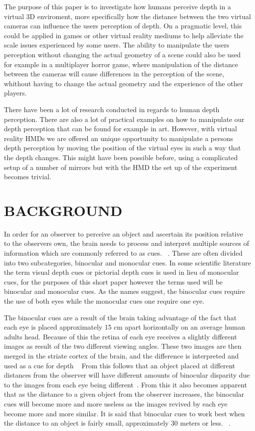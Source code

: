 \documentclass[tog]{acmsiggraph}
\begin{document}
The purpose of this paper is to investigate how humans perceive depth in a virtual 3D enviroment, more specifically how the distance between the two virtual cameras can influence the users perception of depth. On a pragmatic level, this could be applied in games or other virtual reality mediums to help alleviate the scale issues experienced by some users. The ability to manipulate the users perception without changing the actual geometry of a scene could also be used for example in a multiplayer horror game, where manipulation of the distance between the cameras will cause differences in the perception of the scene, whithout having to change the actual geometry and the experience of the other players.    

There have been a lot of research conducted in regards to human depth perception. There are also a lot of practical examples on how to manipulate our depth perception that can be found for example in art. However, with virtual reality HMDs we are offered an unique opportunity to manipulate a persons depth perception by moving the position of the virtual eyes in such a way that the depth changes. This might have been possible before, using a complicated setup of a number of mirrors but with the HMD the set up of the experiment becomes trivial.  


\section{BACKGROUND}
In order for an observer to perceive an object and ascertain its position relative to the observers own, the brain needs to process and interpret multiple sources of information which are commonly referred to as cues. ~\cite {Reichelt et al:2010:DPHV}. These are often divided into two subcategories, binocular and monocular cues. In some scientific literature the term visual depth cues or pictorial depth cues is used in lieu of monocular cues, for the purposes of this short paper however the terms used will be binocular and monocular cues. As the names suggest, the binocular cues require the use of both eyes while the monocular cues one require one eye.

The binocular cues are a result of the brain taking advantage of the fact that each eye is placed approximately 15 cm apart horizontally on an average human adults head. Because of this the retina of each eye receives a slightly different images as result of the two different viewing angles. These two images are then merged in the striate cortex of the brain, and the difference is interpreted and used as a cue for depth ~\cite{Reichelt et al:2010:DPHV}   From this follows that an object placed at different distances from the observer will have different amounts of binocular disparity due to the images from each eye being different~\cite {Boyd:2000:DPC}. From this it also becomes apparent that as the distance to a given object from the observer increases, the binocular cues will become more and more useless as the images revived by each eye become more and more similar. It is said that binocular cues to work best when the distance to an object is fairly small, approximately 30 meters or less. ~\cite {Palvqvist:2013:DPDS}.
\end{document}
